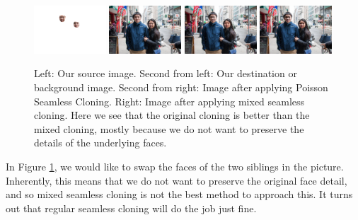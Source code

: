\documentclass[12pt]{article}
\begin{document}
\noindent\begin{figure}[H]
\centering
\includegraphics[width=0.24\textwidth,keepaspectratio]{data/SeamlessCloning/siblings/siblings_fore.jpg}
\includegraphics[width=0.24\textwidth,keepaspectratio]{data/SeamlessCloning/siblings/siblings.jpg}
\includegraphics[width=0.24\textwidth,keepaspectratio]{data/SeamlessCloning/siblings/cloned.jpg}
\includegraphics[width=0.24\textwidth,keepaspectratio]{data/SeamlessCloning/siblings/mixed_cloned.jpg}
\caption{Left: Our source image. Second from left: Our destination or background image. Second from right: Image after applying Poisson Seamless Cloning. Right: Image after applying mixed seamless cloning. Here we see that the original cloning is better than the mixed cloning, mostly because we do not want to preserve the details of the underlying faces.}
\label{siblings}
\end{figure}

In Figure \ref{siblings}, we would like to swap the faces of the two siblings in the picture. Inherently, this means that we do not want to preserve the original face detail, and so mixed seamless cloning is not the best method to approach this. It turns out that regular seamless cloning will do the job just fine.
\end{document}
